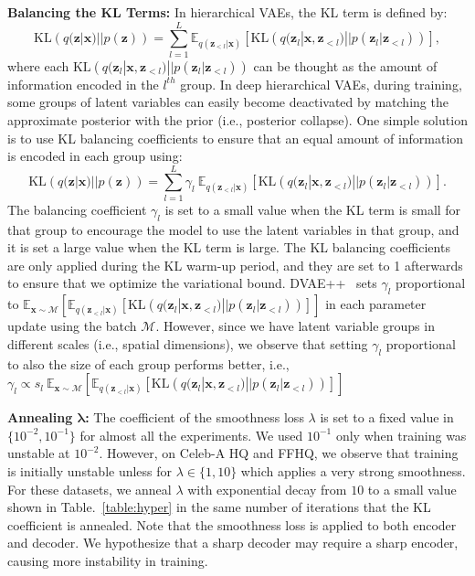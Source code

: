 \documentclass{article}
\newcommand{\x}{{\pmb{x}}}
\newcommand{\z}{{\pmb{z}}}
\newcommand{\KL}[2]{\text{KL}\!\left(#1 || #2\right)}
\newcommand{\E}{{\mathbb{E}}}
\begin{document}
\textbf{Balancing the KL Terms:} In hierarchical VAEs, the KL term is defined by:
\begin{equation*}
\KL{q(\z|\x)}{p(\z)} = \sum_{l=1}^L \E_{q(\z_{<l}|\x)} \left[ \KL{q(\z_l|\x, \z_{<l})}{p(\z_l|\z_{<l})} \right],
\end{equation*}
where each $\KL{q(\z_l|\x, \z_{<l})}{p(\z_l|\z_{<l})}$ can be thought as the amount of information encoded in the $l^{th}$ group. In deep hierarchical VAEs, during training, some groups of latent variables can easily become deactivated by matching the approximate posterior with the prior (i.e., posterior collapse). One simple solution is to use KL balancing coefficients \cite{Vahdat2018DVAE++, chen2016lossy} to ensure that an equal amount of information is encoded in each group using:
\begin{equation*}
\KL{q(\z|\x)}{p(\z)} = \sum_{l=1}^L \gamma_l \ \E_{q(\z_{<l}|\x)} \left[ \KL{q(\z_l|\x, \z_{<l})}{p(\z_l|\z_{<l})} \right].
\end{equation*}
The balancing coefficient $\gamma_l$ is set to a small value when the KL term is small for that group to encourage the model to use the latent variables in that group, and it is set a large value when the KL term is large. The KL balancing coefficients are only applied during the KL warm-up period, and they are set to 1 afterwards to ensure that we optimize the variational bound. DVAE++~\cite{Vahdat2018DVAE++} sets $\gamma_l$ proportional to $\E_{\x\sim\mathcal{M}} \left[ \E_{q(\z_{<l}|\x)} \left[ \KL{q(\z_l|\x, \z_{<l})}{p(\z_l|\z_{<l})} \right] \right]$ in each parameter update using the batch $\mathcal{M}$. However, since we have latent variable groups in different scales (i.e., spatial dimensions), we observe that setting $\gamma_l$ proportional to also the size of each group performs better, i.e., $\gamma_l \propto s_l \ \E_{\x\sim\mathcal{M}} \left[ \E_{q(\z_{<l}|\x)} \left[ \KL{q(\z_l|\x, \z_{<l})}{p(\z_l|\z_{<l})} \right] \right]$ 

\textbf{Annealing $\pmb{\lambda}$:} The coefficient of the smoothness loss $\lambda$ is set to a fixed value in $\{10^{-2}, 10^{-1}\}$ for almost all the experiments. We used $10^{-1}$ only when training was unstable at $10^{-2}$. However, on Celeb-A HQ and FFHQ, we observe that training is initially unstable unless for $\lambda \in \{1, 10\}$   which applies a very strong smoothness. For these datasets, we anneal $\lambda$ with exponential decay from $10$ to a small value shown in Table.~\ref{table:hyper} in the same number of iterations that the KL coefficient is annealed. Note that the smoothness loss is applied to both encoder and decoder. We hypothesize that a sharp decoder may require a sharp encoder, causing more instability in training.
\end{document}
